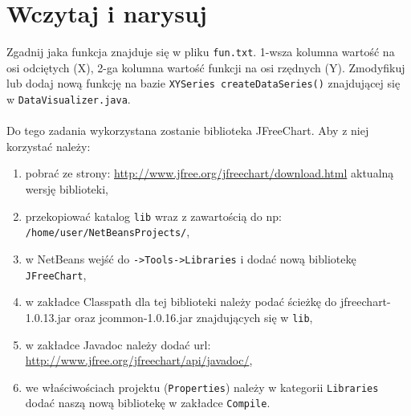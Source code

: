 \documentclass[12pt,letterpaper]{article}
\begin{document}
\section{Wczytaj i narysuj}
Zgadnij jaka funkcja znajduje się w pliku \verb+fun.txt+.
1-wsza kolumna wartość na osi odciętych (X), 2-ga kolumna wartość funkcji na
osi rzędnych (Y). Zmodyfikuj lub dodaj nową funkcję na bazie
\verb+XYSeries createDataSeries()+ znajdującej się w \verb+DataVisualizer.java+.

\paragraph{}

Do tego zadania wykorzystana zostanie biblioteka JFreeChart. Aby z
niej korzystać należy:
\begin{enumerate}
\item pobrać ze strony:
  \url{http://www.jfree.org/jfreechart/download.html} aktualną wersję
  biblioteki,
\item przekopiować katalog \verb+lib+ wraz z zawartością do np:
  \verb+/home/user/NetBeansProjects/+,
\item w NetBeans wejść do \verb+->Tools->Libraries+ i dodać nową
  bibliotekę \verb+JFreeChart+,
\item w zakładce Classpath dla tej biblioteki należy podać ścieżkę do
  jfreechart-1.0.13.jar oraz jcommon-1.0.16.jar znajdujących się w
  \verb+lib+,
\item w zakładce Javadoc należy dodać url:
  \url{http://www.jfree.org/jfreechart/api/javadoc/},
\item we właściwościach projektu (\verb+Properties+) należy w
  kategorii \verb+Libraries+ dodać naszą nową bibliotekę w zakładce \verb+Compile+. 
\end{enumerate}
\end{document}
